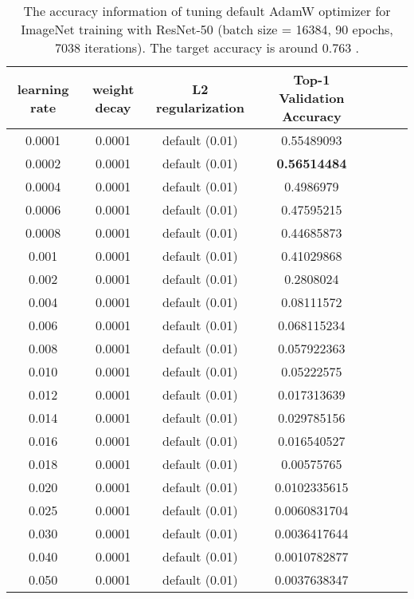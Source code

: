 \documentclass{article} \usepackage{iclr2020_conference,times}
\begin{document}
\begin{table}[ht]
\renewcommand{\arraystretch}{1.3}
\caption{The accuracy information of tuning default AdamW optimizer for ImageNet training with ResNet-50 (batch size = 16384, 90 epochs, 7038 iterations). The target accuracy is around 0.763 \citep{goyal2017accurate}.}
\centering
\begin{tabular}{|c|c|c|c|c|c|c|}
\hline
learning rate & weight decay & L2 regularization & Top-1 Validation Accuracy\\
\hline
\hline
0.0001 & 0.0001 & default (0.01) & 0.55489093 \\
\hline
0.0002 & 0.0001 & default (0.01) & {\bf 0.56514484} \\
\hline
0.0004 & 0.0001 & default (0.01) & 0.4986979 \\
\hline
0.0006 & 0.0001 & default (0.01) & 0.47595215 \\
\hline
0.0008 & 0.0001 & default (0.01) & 0.44685873 \\
\hline
0.001 & 0.0001 & default (0.01) & 0.41029868 \\
\hline
0.002 & 0.0001 & default (0.01) & 0.2808024 \\
\hline
0.004 & 0.0001 & default (0.01) & 0.08111572 \\
\hline
0.006 & 0.0001 & default (0.01) & 0.068115234 \\
\hline
0.008 & 0.0001 & default (0.01) & 0.057922363 \\
\hline
0.010 & 0.0001 & default (0.01) & 0.05222575 \\
\hline
0.012 & 0.0001 & default (0.01) & 0.017313639 \\
\hline
0.014 & 0.0001 & default (0.01) & 0.029785156 \\
\hline
0.016 & 0.0001 & default (0.01) & 0.016540527 \\
\hline
0.018 & 0.0001 & default (0.01) & 0.00575765 \\
\hline
0.020 & 0.0001 & default (0.01) & 0.0102335615 \\
\hline
0.025 & 0.0001 & default (0.01) & 0.0060831704 \\
\hline
0.030 & 0.0001 & default (0.01) & 0.0036417644 \\
\hline
0.040 & 0.0001 & default (0.01) & 0.0010782877 \\
\hline
0.050 & 0.0001 & default (0.01) & 0.0037638347 \\
\hline
\end{tabular}
\label{table:imagenet_adamw_default_l2_2}
\end{table}
\end{document}
